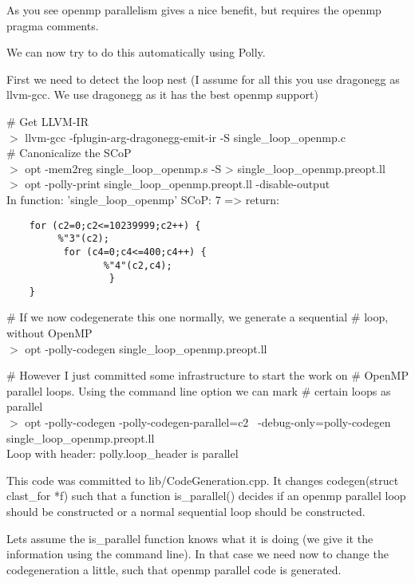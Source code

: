 \documentclass[a4paper,10pt]{article}
\begin{document}
As you see openmp parallelism gives a nice benefit, but requires the openmp pragma comments.

We can now try to do this automatically using Polly.

First we need to detect the loop nest (I assume for all this you use dragonegg as llvm-gcc. We use dragonegg as it has the best openmp support)

\# Get LLVM-IR\\
    $>$ llvm-gcc -fplugin-arg-dragonegg-emit-ir -S single\_loop\_openmp.c\\
\# Canonicalize the SCoP\\
    $>$ opt -mem2reg single\_loop\_openmp.s -S > single\_loop\_openmp.preopt.ll\\
    $>$ opt -polly-print single\_loop\_openmp.preopt.ll -disable-output\\
    In function: 'single\_loop\_openmp' SCoP: 7 => return:
\begin{verbatim}    
    for (c2=0;c2<=10239999;c2++) {
         %"3"(c2);
          for (c4=0;c4<=400;c4++) {
                 %"4"(c2,c4);
                  }
    }
\end{verbatim}
\# If we now codegenerate this one normally, we generate a sequential
\# loop, without OpenMP\\
$>$ opt -polly-codegen single\_loop\_openmp.preopt.ll

\# However I just committed some infrastructure to start the work on
\# OpenMP parallel loops. Using the command line option we can mark
\# certain loops as parallel\\
$>$ opt -polly-codegen -polly-codegen-parallel=c2 \
                                              -debug-only=polly-codegen single\_loop\_openmp.preopt.ll\\
                                              Loop with header: polly.loop\_header is parallel

                                              This code was committed to lib/CodeGeneration.cpp. It changes codegen(struct clast\_for *f) such that a function is\_parallel() decides if an openmp parallel loop should be constructed or a normal sequential loop should be constructed.

                                              Lets assume the is\_parallel function knows what it is doing (we give it the information using the command line). In that case we need now to change the codegeneration a little, such that openmp parallel code is generated.
\end{document}

